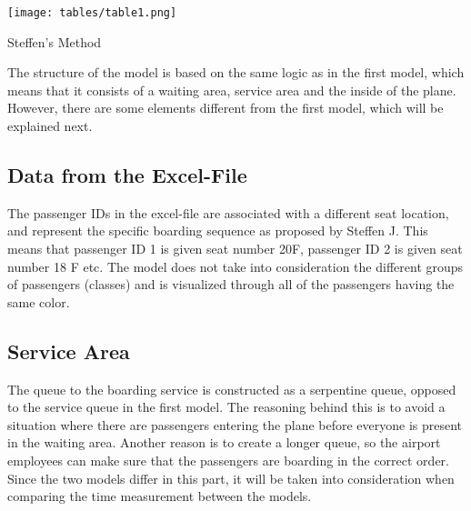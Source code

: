 \begin{table}[H]
  \texttt{[image: tables/table1.png]}
  \caption{Steffen's Method}
  \label{tbl:table1}
\end{table}

The structure of the model is based on the same logic as in the first model, which means that it consists of a waiting area, service area and the inside of the plane. However, there are some elements different from the first model, which will be explained next.

\subsection{Data from the Excel-File}
The passenger IDs in the excel-file are associated with a different seat location, and represent the specific boarding sequence as proposed by Steffen J. This means that passenger ID 1 is given seat number 20F, passenger ID 2 is given seat number 18 F etc. The model does not take into consideration the different groups of passengers (classes) and is visualized through all of the passengers having the same color.

\subsection{Service Area}
The queue to the boarding service is constructed as a serpentine queue, opposed to the service queue in the first model. The reasoning behind this is to avoid a situation where there are passengers entering the plane before everyone is present in the waiting area. Another reason is to create a longer queue, so the airport employees can make sure that the passengers are boarding in the correct order. Since the two models differ in this part, it will be taken into consideration when comparing the time measurement between the models. 

